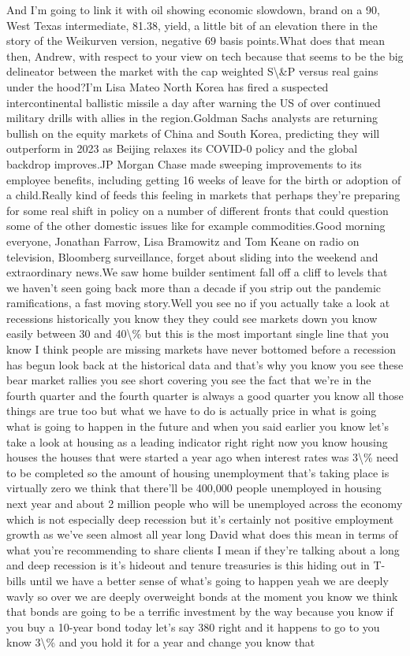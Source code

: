 \documentclass{article}%
\begin{document}
And I'm going to link it with oil showing economic slowdown, brand on a 90, West Texas intermediate, 81.38, yield, a little bit of an elevation there in the story of the Weikurven version, negative 69 basis points.What does that mean then, Andrew, with respect to your view on tech because that seems to be the big delineator between the market with the cap weighted S\textbackslash{}\&P versus real gains under the hood?I'm Lisa Mateo North Korea has fired a suspected intercontinental ballistic missile a day after warning the US of over continued military drills with allies in the region.Goldman Sachs analysts are returning bullish on the equity markets of China and South Korea, predicting they will outperform in 2023 as Beijing relaxes its COVID{-}0 policy and the global backdrop improves.JP Morgan Chase made sweeping improvements to its employee benefits, including getting 16 weeks of leave for the birth or adoption of a child.Really kind of feeds this feeling in markets that perhaps they're preparing for some real shift in policy on a number of different fronts that could question some of the other domestic issues like for example commodities.Good morning everyone, Jonathan Farrow, Lisa Bramowitz and Tom Keane on radio on television, Bloomberg surveillance, forget about sliding into the weekend and extraordinary news.We saw home builder sentiment fall off a cliff to levels that we haven't seen going back more than a decade if you strip out the pandemic ramifications, a fast moving story.Well you see no if you actually take a look at recessions historically you know they they could see markets down you know easily between 30 and 40\textbackslash{}\% but this is the most important single line that you know I think people are missing markets have never bottomed before a recession has begun look back at the historical data and that's why you know you see these bear market rallies you see short covering you see the fact that we're in the fourth quarter and the fourth quarter is always a good quarter you know all those things are true too but what we have to do is actually price in what is going what is going to happen in the future and when you said earlier you know let's take a look at housing as a leading indicator right right now you know housing houses the houses that were started a year ago when interest rates was 3\textbackslash{}\% need to be completed so the amount of housing unemployment that's taking place is virtually zero we think that there'll be 400,000 people unemployed in housing next year and about 2 million people who will be unemployed across the economy which is not especially deep recession but it's certainly not positive employment growth as we've seen almost all year long David what does this mean in terms of what you're recommending to share clients I mean if they're talking about a long and deep recession is it's hideout and tenure treasuries is this hiding out in T{-}bills until we have a better sense of what's going to happen yeah we are deeply wavly so over we are deeply overweight bonds at the moment you know we think that bonds are going to be a terrific investment by the way because you know if you buy a 10{-}year bond today let's say 380 right and it happens to go to you know 3\textbackslash{}\% and you hold it for a year and change you know that 
\end{document}
